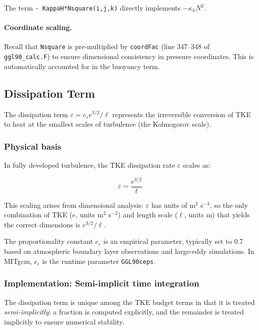 \documentclass[12pt,letterpaper]{article}
\begin{document}
The term \verb|- KappaH*Nsquare(i,j,k)| directly implements $-\kappa_h N^2$.

\paragraph{Coordinate scaling.} Recall that \verb|Nsquare| is pre-multiplied by \verb|coordFac| (line 347--348 of \verb|ggl90_calc.F|) to ensure dimensional consistency in pressure coordinates. This is automatically accounted for in the buoyancy term.

\subsection{Dissipation Term}
\label{sec:tke_dissipation}

The dissipation term $\varepsilon = c_\varepsilon e^{3/2} / \ell$ represents the irreversible conversion of TKE to heat at the smallest scales of turbulence (the Kolmogorov scale).

\subsubsection{Physical basis}

In fully developed turbulence, the TKE dissipation rate $\varepsilon$ scales as:

\begin{equation}
\varepsilon \sim \frac{e^{3/2}}{\ell}
\label{eq:dissipation_scaling}
\end{equation}

This scaling arises from dimensional analysis: $\varepsilon$ has units of m$^2$ s$^{-3}$, so the only combination of TKE ($e$, units m$^2$ s$^{-2}$) and length scale ($\ell$, units m) that yields the correct dimensions is $e^{3/2}/\ell$.

The proportionality constant $c_\varepsilon$ is an empirical parameter, typically set to 0.7 based on atmospheric boundary layer observations and large-eddy simulations. In MITgcm, $c_\varepsilon$ is the runtime parameter \verb|GGL90ceps|.

\subsubsection{Implementation: Semi-implicit time integration}

The dissipation term is unique among the TKE budget terms in that it is treated \emph{semi-implicitly}: a fraction is computed explicitly, and the remainder is treated implicitly to ensure numerical stability.
\end{document}
